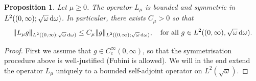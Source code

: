 \documentclass[reqno,11pt,letterpaper]{amsart}
\numberwithin{equation}{section}
\newcommand{\dd}{\, {\rm d}}
\newtheorem{proposition}{Proposition}[section]
\begin{document}
\begin{proposition}
    Let $\mu \geq 0$. The operator $L_\mu$ is bounded and symmetric in $L^2((0, \infty); \sqrt{\omega} \dd \omega)$. In particular, there exists $C_\mu>0$ so that  
    $$
\|L_\mu g\|_{L^2((0, \infty); \sqrt{\omega} \dd \omega) }\leq C_\mu\|g\|_{L^2((0, \infty); \sqrt{\omega} \dd \omega)},
\quad  \text{for all } g\in L^2((0, \infty), \sqrt{\omega} \dd \omega).$$
\end{proposition}

\begin{proof}
First we assume that $g \in C_c^\infty(0,\infty)$, so that the symmetrisation procedure above is well-justified (Fubini is allowed). We will in the end extend the operator $L_\mu$ uniquely to a bounded self-adjoint operator on $L^2(\sqrt{\omega})$. 


\end{proof}
\end{document}
